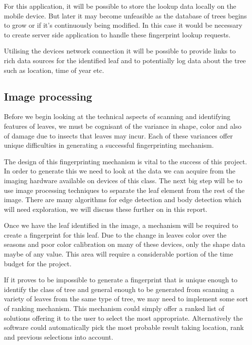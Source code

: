 For this application, it will be possible to store the lookup data locally on the mobile device. But later it may become unfeasible as the database of trees begins to grow or if it’s continuously being modified. In this case it would be necessary to create server side application to handle these fingerprint lookup requests.

Utilising the devices network connection it will be possible to provide links to rich data sources for the identified leaf and to potentially log data about the tree such as location, time of year etc.

\subsection*{Image processing}
Before we begin looking at the technical aspects of scanning and identifying features of leaves, we must be cognisant of the variance in shape, color and also of damage due to insects that leaves may incur. Each of these variances offer unique difficulties in generating a successful fingerprinting mechanism.

The design of this fingerprinting mechanism is vital to the success of this project. In order to generate this we need to look at the data we can acquire from the imaging hardware available on devices of this class. The next big step will be to use image processing techniques to separate the leaf element from the rest of the image. There are many algorithms for edge detection and body detection which will need exploration, we will discuss these further on in this report.

Once we have the leaf identified in the image, a mechanism will be required to create a fingerprint for this leaf. Due to the change in leaves color over the seasons and poor color calibration on many of these devices, only the shape data maybe of any value. This area will require a considerable portion of the time budget for the project.

If it proves to be impossible to generate a fingerprint that is unique enough to identify the class of tree and general enough to be generated from scanning a variety of leaves from the same type of tree, we may need to implement some sort of ranking mechanism. This mechanism could simply offer a ranked list of solutions offering it to the user to select the most appropriate. Alternatively the software could automatically pick the most probable result taking location, rank and previous selections into account.

